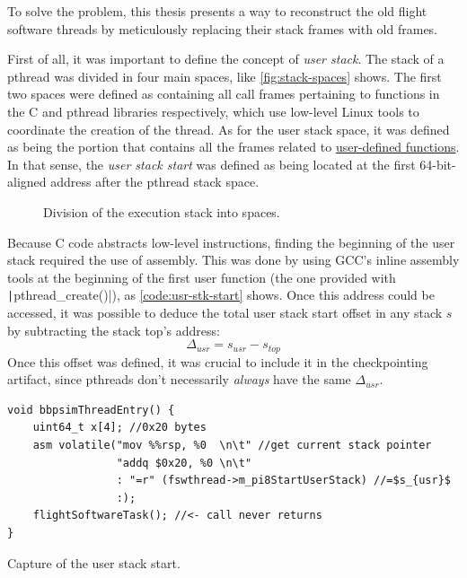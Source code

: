 To solve the problem, this thesis presents a way to reconstruct the old flight software threads by meticulously replacing their stack frames with old frames. 

First of all, it was important to define the concept of \textit{user stack}. The stack of a pthread was divided in four main spaces, like \autoref{fig:stack-spaces} shows. The first two spaces were defined as containing all call frames pertaining to functions in the C and pthread libraries respectively, which use low-level Linux tools to coordinate the creation of the thread. As for the user stack space, it was defined as being the portion that contains all the frames related to \ul{user-defined functions}. In that sense, the \textit{user stack start} was defined as being located at the first 64-bit-aligned address after the pthread stack space. 
\begin{figure}[htbp]
	\centering 
	
	\caption{Division of the execution stack into spaces.}
	\label{fig:stack-spaces}
\end{figure}

Because C code abstracts low-level instructions, finding the beginning of the user stack required the use of assembly. This was done by using \gls{GCC}'s inline assembly tools at the beginning of the first user function (the one provided with \texttt|pthread_create()|), as \autoref{code:usr-stk-start} shows\cite{online:inline-asm}. Once this address could be accessed, it was possible to deduce the total user stack start offset in any stack $s$ by subtracting the stack top's address:
\[
	\Delta_{usr}=s_{usr}-s_{top}
\]
Once this offset was defined, it was crucial to include it in the checkpointing artifact, since pthreads don't necessarily \textit{always} have the same $\Delta_{usr}$. 
\begin{listing}[htpb]
	\centering
	\begin{verbatim}
void bbpsimThreadEntry() {
	uint64_t x[4]; //0x20 bytes 
	asm volatile("mov %%rsp, %0  \n\t" //get current stack pointer
                 "addq $0x20, %0 \n\t" 
                 : "=r" (fswthread->m_pi8StartUserStack) //=$s_{usr}$
                 :);
	flightSoftwareTask(); //<- call never returns
}
	\end{verbatim}
	\caption{Capture of the user stack start.}
	\label{code:usr-stk-start}
\end{listing}

